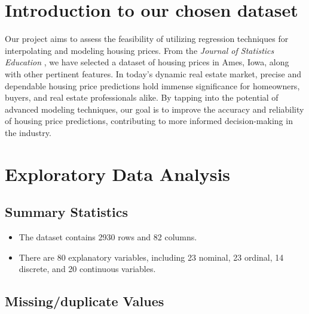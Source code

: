 \documentclass[aoas]{imsart}
\providecommand{\tightlist}{%
  \setlength{\itemsep}{0pt}\setlength{\parskip}{0pt}}
\numberwithin{equation}{section}
\theoremstyle{plain}
\theoremstyle{remark}
\begin{document}
\newenvironment{kframe}{}{}

\hypertarget{introduction-to-our-chosen-dataset}{%
\section{Introduction to our chosen
dataset}\label{introduction-to-our-chosen-dataset}}

\hfill\break
Our project aims to assess the feasibility of utilizing regression
techniques for interpolating and modeling housing prices. From the
\emph{Journal of Statistics Education} \citep{cock2011amesdataset}, we
have selected a dataset of housing prices in Ames, Iowa, along with
other pertinent features. In today's dynamic real estate market, precise
and dependable housing price predictions hold immense significance for
homeowners, buyers, and real estate professionals alike. By tapping into
the potential of advanced modeling techniques, our goal is to improve
the accuracy and reliability of housing price predictions, contributing
to more informed decision-making in the industry.

\hypertarget{exploratory-data-analysis}{%
\section{Exploratory Data Analysis}\label{exploratory-data-analysis}}

\hypertarget{summary-statistics}{%
\subsection{Summary Statistics}\label{summary-statistics}}

\begin{itemize}
\tightlist
\item
  The dataset contains 2930 rows and 82 columns.
\item
  There are 80 explanatory variables, including 23 nominal, 23 ordinal,
  14 discrete, and 20 continuous variables.
\end{itemize}

\hypertarget{missingduplicate-values}{%
\subsection{Missing/duplicate Values}\label{missingduplicate-values}}
\end{document}
